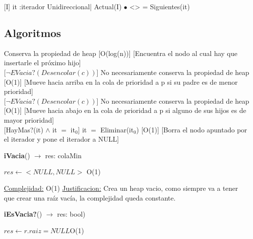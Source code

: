 \begin{Representacion}
[I]{ it :iterador Unidireccional| Actual(I) $\bullet$ <> = Siguientes(it)}

\subsection{Algoritmos}


{Conserva la propiedad de heap}
[O(log(n))]
[Encuentra el nodo al cual hay que insertarle el próximo hijo]\\

[$\neg EVacia?(Desencolar(c))$]
{No necesariamente conserva la propiedad de heap}
[O(1)]
[Mueve hacia arriba en la cola de prioridad a p si su padre es de menor prioridad]\\

[$\neg EVacia?(Desencolar(c))$]
{No necesariamente conserva la propiedad de heap}
[O(1)]
[Mueve hacia abajo en la cola de prioridad a p si alguno de sus hijos es de mayor prioridad]\\

[HayMas?(it) $\wedge$ it $=$ it$_0$]
{it $=$ Eliminar(it$_0$)}
[O(1)]
[Borra el nodo apuntado por el iterador y pone el iterador a NULL]\\

\begin{Algoritmos}

\begin{algorithm}[H]{\textbf{iVacia}() $\to$ res: colaMin}
	\begin{algorithmic}[1]
		\State $res \gets <NULL, NULL>$ \Comment O(1)
		
		\medskip
		\Statex \underline{Complejidad:} O(1)
			\Statex \underline{Justificacion:} Crea un heap vacio, como siempre va a tener que crear una raíz vacía, la complejidad queda constante.
	\end{algorithmic}
\end{algorithm}


\begin{algorithm}[H]{\textbf{iEsVacia?}() $\to$ res: bool)}
	\begin{algorithmic}[1]
		\State $res \gets r.raiz = NULL$\Comment O(1)
		

\end{algorithmic}
\end{algorithm}
\end{Algoritmos}
\end{Representacion}
